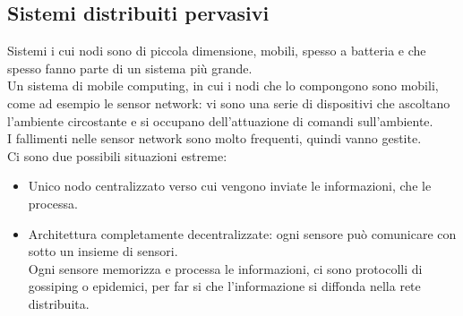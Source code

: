 \documentclass{article}
\begin{document}
\subsection{Sistemi distribuiti pervasivi}
Sistemi i cui nodi sono di piccola dimensione, mobili, spesso a batteria e che spesso fanno parte di un sistema più grande.\\ Un sistema di mobile computing, in cui i nodi che lo compongono sono mobili, come ad esempio le sensor network:  vi sono una serie di dispositivi che ascoltano l'ambiente circostante e si occupano dell'attuazione di comandi sull'ambiente.\\ I fallimenti nelle sensor network sono molto frequenti, quindi vanno gestite.\\ Ci sono due possibili situazioni estreme:
\begin{itemize}
\item Unico nodo centralizzato verso cui vengono inviate le informazioni, che le processa.
\item Architettura completamente decentralizzate: ogni sensore può comunicare con sotto un insieme di sensori. \\Ogni sensore memorizza e processa le informazioni, ci sono protocolli di gossiping o epidemici, per far si che l'informazione si diffonda nella rete distribuita.
\end{itemize}
\end{document}
